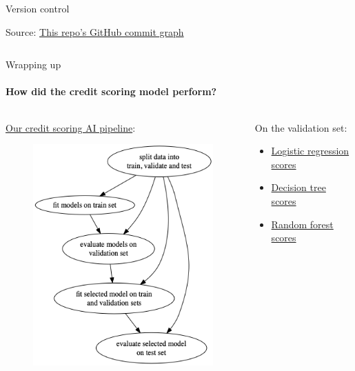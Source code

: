 \begin{frame}
\begin{columns}[T]
\begin{column}{0.48\textwidth}
\begin{block}{Version control}
\begin{figure}[ht]
                \end{figure}
                Source: \href{https://github.com/munichpavel/risk-ai-workshop/network}{This repo's GitHub commit graph}
            \end{block}
        \end{column}
    \end{columns}
\end{frame}

\begin{frame}{Wrapping up}
    \framesubtitle{How did the credit scoring model perform?}
    \begin{columns}[T]
        \begin{column}{0.48\textwidth}
            \href{https://github.com/munichpavel/risk-ai-workshop/blob/main/risk_learning/model_selection/run-pipeline.py}{Our credit scoring AI pipeline}:
            \begin{figure}[ht]
                \includegraphics[height=0.5\textheight]{graphics/ml_pipeline}
            \end{figure}
        \end{column}
        \begin{column}{0.48\textwidth}
            On the validation set:
            \begin{itemize}
                \item \href{https://github.com/munichpavel/risk-ai-workshop/blob/main/notebooks/data/evaluate_fit_train/metrics_logistic_regression.json}{Logistic regression scores}
                \item \href{https://github.com/munichpavel/risk-ai-workshop/blob/main/notebooks/data/evaluate_fit_train/metrics_decision_tree_classifier.json}{Decision tree scores}
                \item \href{https://github.com/munichpavel/risk-ai-workshop/blob/main/notebooks/data/evaluate_fit_train/metrics_random_forest_classifier.json}{Random forest scores}
            \end{itemize}


\end{column}
\end{columns}
\end{frame}
